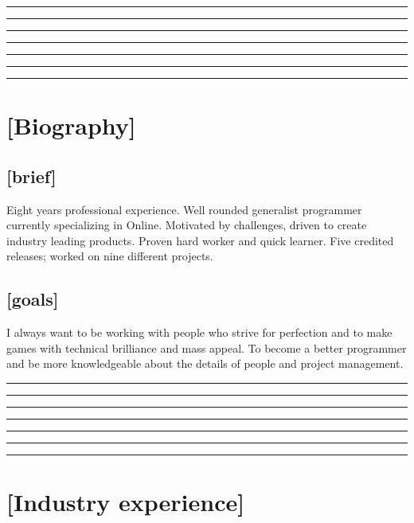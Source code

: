 \documentclass[a4paper]{res}
\newcommand{\setrule}[1]{\rule{#1}{1mm}}
\newcommand{\fibrule}[2]{ \hspace{#1}  \setrule{#2} \setrule{21mm} \setrule{13mm} \setrule{8mm} \setrule{5mm} \setrule{3mm} \setrule{2mm}  \vspace{-.52in} }
\begin{document}
 
\thispagestyle{empty} %
\address{}
\begin{resume}


\fibrule{0.9in}{3.0in}
\section{[Biography]} 

\vspace{-.12in}

\subsection{[brief]}
\mbox{}
\vspace{-.12in}

Eight years professional experience.
Well rounded generalist programmer currently specializing in Online.
Motivated by challenges, driven to create industry leading products.
Proven hard worker and quick learner.
Five credited releases; worked on nine different projects.  

\vspace{-.22in}

\subsection{[goals]}
\mbox{}
\vspace{-.12in}

I always want to be working with people who strive for perfection and to make games with technical brilliance and mass appeal. To become a better programmer and be more knowledgeable about the details of people and project management.


\fibrule{2.15in}{1.75in}
\section{[Industry experience]}

\vspace{-.12in}


\end{resume}
\end{document}
